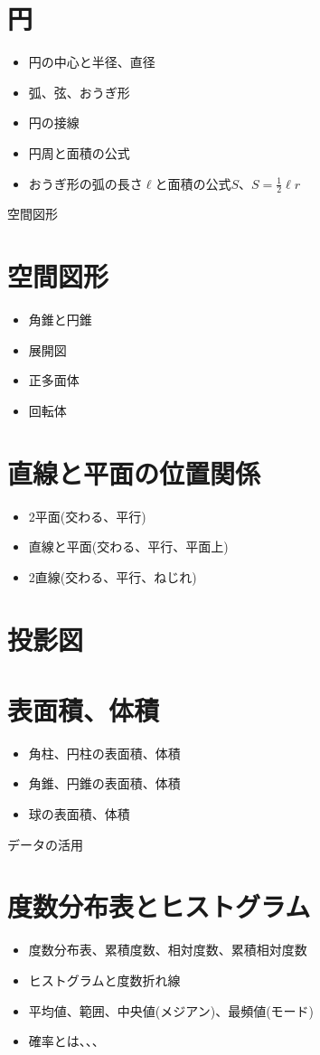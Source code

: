 \documentclass[11pt]{article}
\begin{document}
\section{円}
\begin{itemize}
\item 円の中心と半径、直径
\item 弧、弦、おうぎ形
\item 円の接線
\item 円周と面積の公式
\item おうぎ形の弧の長さ$\ell$と面積の公式$S$、$S=\frac{1}{2} \ell r$
\end{itemize}

\newpage

{\LARGE \noindent 空間図形}
\section{空間図形}
\begin{itemize}
\item 角錐と円錐
\item 展開図
\item 正多面体
\item 回転体
\end{itemize}

\section{直線と平面の位置関係}
\begin{itemize}
\item 2平面(交わる、平行)
\item 直線と平面(交わる、平行、平面上)
\item 2直線(交わる、平行、ねじれ)
\end{itemize}

\section{投影図}

\section{表面積、体積}
\begin{itemize}
\item 角柱、円柱の表面積、体積
\item 角錐、円錐の表面積、体積
\item 球の表面積、体積
\end{itemize}

\newpage

{\LARGE \noindent データの活用}
\section{度数分布表とヒストグラム}
\begin{itemize}
\item 度数分布表、累積度数、相対度数、累積相対度数
\item ヒストグラムと度数折れ線
\item 平均値、範囲、中央値(メジアン)、最頻値(モード)
\item 確率とは、、、
\end{itemize}
\end{document}
